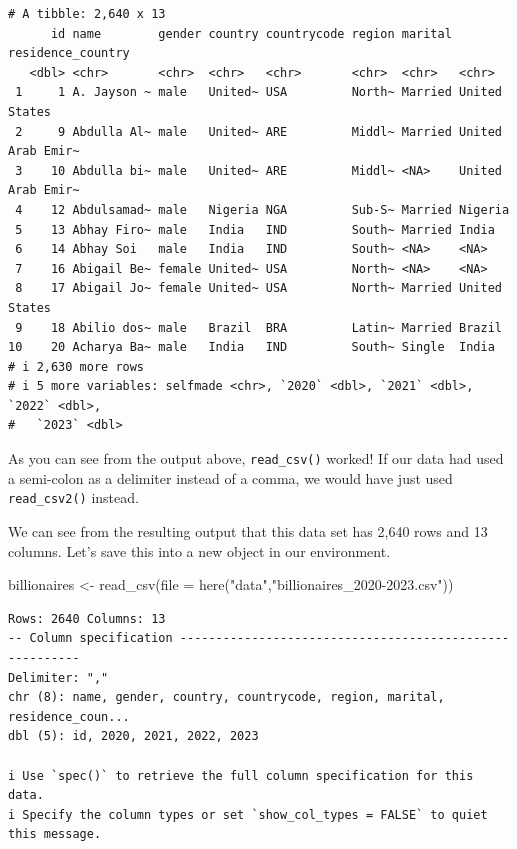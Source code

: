 \documentclass[
  letterpaper,
]{book}
\newenvironment{Shaded}{\begin{snugshade}}{\end{snugshade}}
\newcommand{\AttributeTok}[1]{\textcolor[rgb]{0.40,0.45,0.13}{#1}}
\newcommand{\FunctionTok}[1]{\textcolor[rgb]{0.28,0.35,0.67}{#1}}
\newcommand{\NormalTok}[1]{\textcolor[rgb]{0.00,0.23,0.31}{#1}}
\newcommand{\OtherTok}[1]{\textcolor[rgb]{0.00,0.23,0.31}{#1}}
\newcommand{\StringTok}[1]{\textcolor[rgb]{0.13,0.47,0.30}{#1}}
\begin{document}
\begin{verbatim}
# A tibble: 2,640 x 13
      id name        gender country countrycode region marital residence_country
   <dbl> <chr>       <chr>  <chr>   <chr>       <chr>  <chr>   <chr>            
 1     1 A. Jayson ~ male   United~ USA         North~ Married United States    
 2     9 Abdulla Al~ male   United~ ARE         Middl~ Married United Arab Emir~
 3    10 Abdulla bi~ male   United~ ARE         Middl~ <NA>    United Arab Emir~
 4    12 Abdulsamad~ male   Nigeria NGA         Sub-S~ Married Nigeria          
 5    13 Abhay Firo~ male   India   IND         South~ Married India            
 6    14 Abhay Soi   male   India   IND         South~ <NA>    <NA>             
 7    16 Abigail Be~ female United~ USA         North~ <NA>    <NA>             
 8    17 Abigail Jo~ female United~ USA         North~ Married United States    
 9    18 Abilio dos~ male   Brazil  BRA         Latin~ Married Brazil           
10    20 Acharya Ba~ male   India   IND         South~ Single  India            
# i 2,630 more rows
# i 5 more variables: selfmade <chr>, `2020` <dbl>, `2021` <dbl>, `2022` <dbl>,
#   `2023` <dbl>
\end{verbatim}

As you can see from the output above, \texttt{read\_csv()} worked! If
our data had used a semi-colon as a delimiter instead of a comma, we
would have just used \texttt{read\_csv2()} instead.

We can see from the resulting output that this data set has 2,640 rows
and 13 columns. Let's save this into a new object in our environment.

\begin{Shaded}
\begin{Highlighting}[]
\NormalTok{billionaires }\OtherTok{\textless{}{-}} \FunctionTok{read\_csv}\NormalTok{(}\AttributeTok{file =} \FunctionTok{here}\NormalTok{(}\StringTok{"data"}\NormalTok{,}\StringTok{"billionaires\_2020{-}2023.csv"}\NormalTok{))}
\end{Highlighting}
\end{Shaded}

\begin{verbatim}
Rows: 2640 Columns: 13
-- Column specification --------------------------------------------------------
Delimiter: ","
chr (8): name, gender, country, countrycode, region, marital, residence_coun...
dbl (5): id, 2020, 2021, 2022, 2023

i Use `spec()` to retrieve the full column specification for this data.
i Specify the column types or set `show_col_types = FALSE` to quiet this message.
\end{verbatim}
\end{document}
